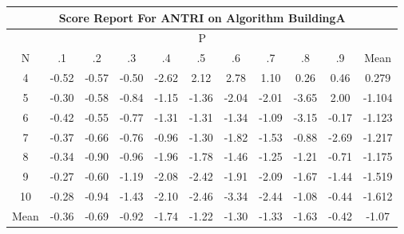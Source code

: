 \documentclass[11pt,a4paper]{report}
\begin{document}
\begin{longtable}{ | c || c | c | c | c | c | c | c | c | c || c |}
\hline
\multicolumn{11}{|c|}{ Score Report For ANTRI on Algorithm BuildingA} \\
\hline
\multicolumn{11}{|c|}{ P } \\
\hline
N & .1 & .2 & .3 & .4 & .5 & .6 & .7 & .8 & .9 & Mean\\
 \hline
 \hline
 \endhead
  4 &  \cellcolor[HTML]{FFEFEF} -0.52 &  \cellcolor[HTML]{FFEFEF} -0.57 &  \cellcolor[HTML]{FFEFEF} -0.50 &  \cellcolor[HTML]{FFBFBF} -2.62 &  \cellcolor[HTML]{C7C7FF} 2.12 &  \cellcolor[HTML]{B7B7FF} 2.78 &  \cellcolor[HTML]{E7E7FF} 1.10 &  \cellcolor[HTML]{F7F7FF} 0.26 &  \cellcolor[HTML]{F7F7FF} 0.46 & 0.279 \\
  5 &  \cellcolor[HTML]{FFF7F7} -0.30 &  \cellcolor[HTML]{FFEFEF} -0.58 &  \cellcolor[HTML]{FFE7E7} -0.84 &  \cellcolor[HTML]{FFDFDF} -1.15 &  \cellcolor[HTML]{FFDFDF} -1.36 &  \cellcolor[HTML]{FFCFCF} -2.04 &  \cellcolor[HTML]{FFCFCF} -2.01 &  \cellcolor[HTML]{FFA7A7} -3.65 &  \cellcolor[HTML]{CFCFFF} 2.00 & -1.104 \\
  6 &  \cellcolor[HTML]{FFF7F7} -0.42 &  \cellcolor[HTML]{FFEFEF} -0.55 &  \cellcolor[HTML]{FFEFEF} -0.77 &  \cellcolor[HTML]{FFDFDF} -1.31 &  \cellcolor[HTML]{FFDFDF} -1.31 &  \cellcolor[HTML]{FFDFDF} -1.34 &  \cellcolor[HTML]{FFE7E7} -1.09 &  \cellcolor[HTML]{FFAFAF} -3.15 &  \cellcolor[HTML]{FFF7F7} -0.17 & -1.123 \\
  7 &  \cellcolor[HTML]{FFF7F7} -0.37 &  \cellcolor[HTML]{FFEFEF} -0.66 &  \cellcolor[HTML]{FFEFEF} -0.76 &  \cellcolor[HTML]{FFE7E7} -0.96 &  \cellcolor[HTML]{FFDFDF} -1.30 &  \cellcolor[HTML]{FFCFCF} -1.82 &  \cellcolor[HTML]{FFD7D7} -1.53 &  \cellcolor[HTML]{FFE7E7} -0.88 &  \cellcolor[HTML]{FFBFBF} -2.69 & -1.217 \\
  8 &  \cellcolor[HTML]{FFF7F7} -0.34 &  \cellcolor[HTML]{FFE7E7} -0.90 &  \cellcolor[HTML]{FFE7E7} -0.96 &  \cellcolor[HTML]{FFCFCF} -1.96 &  \cellcolor[HTML]{FFCFCF} -1.78 &  \cellcolor[HTML]{FFD7D7} -1.46 &  \cellcolor[HTML]{FFDFDF} -1.25 &  \cellcolor[HTML]{FFDFDF} -1.21 &  \cellcolor[HTML]{FFEFEF} -0.71 & -1.175 \\
  9 &  \cellcolor[HTML]{FFF7F7} -0.27 &  \cellcolor[HTML]{FFEFEF} -0.60 &  \cellcolor[HTML]{FFDFDF} -1.19 &  \cellcolor[HTML]{FFC7C7} -2.08 &  \cellcolor[HTML]{FFBFBF} -2.42 &  \cellcolor[HTML]{FFCFCF} -1.91 &  \cellcolor[HTML]{FFC7C7} -2.09 &  \cellcolor[HTML]{FFD7D7} -1.67 &  \cellcolor[HTML]{FFD7D7} -1.44 & -1.519 \\
  10 &  \cellcolor[HTML]{FFF7F7} -0.28 &  \cellcolor[HTML]{FFE7E7} -0.94 &  \cellcolor[HTML]{FFD7D7} -1.43 &  \cellcolor[HTML]{FFC7C7} -2.10 &  \cellcolor[HTML]{FFBFBF} -2.46 &  \cellcolor[HTML]{FFA7A7} -3.34 &  \cellcolor[HTML]{FFBFBF} -2.44 &  \cellcolor[HTML]{FFE7E7} -1.08 &  \cellcolor[HTML]{FFF7F7} -0.44 & -1.612 \\
 \hline
 \hline
Mean &  \cellcolor[HTML]{FFF7F7} -0.36 &  \cellcolor[HTML]{FFEFEF} -0.69 &  \cellcolor[HTML]{FFE7E7} -0.92 &  \cellcolor[HTML]{FFD7D7} -1.74 &  \cellcolor[HTML]{FFDFDF} -1.22 &  \cellcolor[HTML]{FFDFDF} -1.30 &  \cellcolor[HTML]{FFDFDF} -1.33 &  \cellcolor[HTML]{FFD7D7} -1.63 &  \cellcolor[HTML]{FFF7F7} -0.42 &  \cellcolor[HTML]{FFE7E7} -1.07
\end{longtable}
\end{document}
